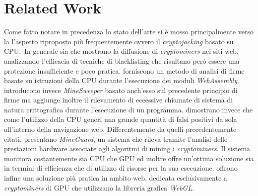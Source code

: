 \documentclass[
11pt, %
oneside, %
english, %
onehalfspacing,%
headsepline, %
]{MastersDoctoralThesis} %
\newcommand\citen[1]{\citeauthor{#1} \citep{#1}}
\begin{document}
{\chapter{Related Work}}
Come fatto notare in precedenza lo stato dell'arte si è mosso principalmente verso la l'aspetto riproposto più frequentemente ovvero il \emph{cryptojacking} basato su CPU.\ In generale sia \citen{musch2018web} che \citen{saad2018end} mostrano la diffusione di \emph{cryptominers} nei siti web, analizzando l'efficacia di tecniche di blacklisting che risultano però essere una protezione insufficiente e poco pratica. \citen{wang2018seismic} forniscono un metodo di analisi di firme basate su istruzioni della CPU durante l'esecuzione dei moduli \emph{WebAssembly}. \citen{konoth2018minesweeper} introducono invece \emph{MineSweeper} basato anch'esso sul precedente principio di firme ma aggiunge inoltre il rilevamento di eccessive chiamate di sistema di natura crittografica durante l'esecuzione di un programma. \citen{kharraz2019outguard} dimostrano invece che come l'utilizzo della CPU generi una grande quantità di falsi positivi da sola all'interno della navigazione web. Differentemente da quelli precedentemente citati, \citen{tahir2017mining} presentano \emph{MineGuard}, un sistema che rileva tramite l'analisi delle prestazioni hardware associate agli algoritmi di mining i \emph{cryptominers}. Il sistema monitora costantemente sia CPU che GPU ed inoltre offre un'ottima soluzione sia in termini di efficienza che di utilizzo di risorse per la sua esecuzione. \citen{belkin2019risks} offrono infine una soluzione più pratica in ambito web, dedicata esclusivamente a \emph{cryptominers} di GPU che utilizzano la libreria grafica \emph{WebGL}.
\end{document}
